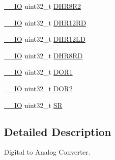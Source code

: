 \begin{DoxyCompactItemize}
\hyperlink{group___c_m_s_i_s__core__definitions_gaec43007d9998a0a0e01faede4133d6be}{\-\_\-\-\_\-\-I\-O} uint32\-\_\-t \hyperlink{struct_d_a_c___type_def_a4c435f0e34ace4421241cd5c3ae87fc2}{D\-H\-R8\-R2}
\item 
\hyperlink{group___c_m_s_i_s__core__definitions_gaec43007d9998a0a0e01faede4133d6be}{\-\_\-\-\_\-\-I\-O} uint32\-\_\-t \hyperlink{struct_d_a_c___type_def_a1590b77e57f17e75193da259da72095e}{D\-H\-R12\-R\-D}
\item 
\hyperlink{group___c_m_s_i_s__core__definitions_gaec43007d9998a0a0e01faede4133d6be}{\-\_\-\-\_\-\-I\-O} uint32\-\_\-t \hyperlink{struct_d_a_c___type_def_acc269320aff0a6482730224a4b641a59}{D\-H\-R12\-L\-D}
\item 
\hyperlink{group___c_m_s_i_s__core__definitions_gaec43007d9998a0a0e01faede4133d6be}{\-\_\-\-\_\-\-I\-O} uint32\-\_\-t \hyperlink{struct_d_a_c___type_def_a9590269cba8412f1be96b0ddb846ef44}{D\-H\-R8\-R\-D}
\item 
\hyperlink{group___c_m_s_i_s__core__definitions_gaec43007d9998a0a0e01faede4133d6be}{\-\_\-\-\_\-\-I\-O} uint32\-\_\-t \hyperlink{struct_d_a_c___type_def_aa710505be03a41981c35bacc7ce20746}{D\-O\-R1}
\item 
\hyperlink{group___c_m_s_i_s__core__definitions_gaec43007d9998a0a0e01faede4133d6be}{\-\_\-\-\_\-\-I\-O} uint32\-\_\-t \hyperlink{struct_d_a_c___type_def_aba9fb810b0cf6cbc1280c5c63be2418b}{D\-O\-R2}
\item 
\hyperlink{group___c_m_s_i_s__core__definitions_gaec43007d9998a0a0e01faede4133d6be}{\-\_\-\-\_\-\-I\-O} uint32\-\_\-t \hyperlink{struct_d_a_c___type_def_af6aca2bbd40c0fb6df7c3aebe224a360}{S\-R}
\end{DoxyCompactItemize}


\subsection{Detailed Description}
Digital to Analog Converter. 

